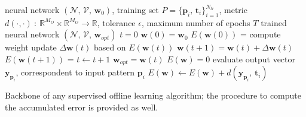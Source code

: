 \documentclass[12pt, a4paper, twoside, openright]{report}
\numberwithin{equation}{chapter}
\theoremstyle{theorem}
\theoremstyle{definition}
\theoremstyle{remark}
\theoremstyle{proposition}
\numberwithin{figure}{chapter}
\begin{document}
		\begin{algorithm}[t]
			\begin{algorithmic}[1]
				\Require neural network $\left( \mathcal{N}, \, \mathcal{V}, \, \mathbf{w}_0 \right)$, training set $P = \big\lbrace \mathbf{p}_i, \, \mathbf{t}_i \big\rbrace_{i = 1}^{N_{tr}}$, 
				\Statex \hspace*{0.535cm} metric $d(\cdot,\cdot) ~ : ~ \mathbb{R}^{M_O} \times \mathbb{R}^{M_O} \rightarrow \mathbb{R}$, tolerance $\epsilon$, maximum number of epochs $T$
				\Ensure trained neural network $\left( \mathcal{N}, \, \mathcal{V}, \, \mathbf{w}_{opt} \right)$
				\vspace*{0.2cm}
				\State $t = 0$
				\State $\mathbf{w}(0) = \mathbf{w}_0$
				\State $E(\mathbf{w}(0))$ = 
					\State compute weight update $\Delta \mathbf{w}(t)$ based on $E(\mathbf{w}(t))$
					\State $\mathbf{w}(t+1) = \mathbf{w}(t) + \Delta \mathbf{w}(t)$
					\State $E(\mathbf{w}(t+1))$ = 
					\State $t \leftarrow t+1$					
				\EndWhile		
				\State $\mathbf{w}_{opt} = \mathbf{w}(t)$
				\vspace*{0.2cm}
					\State $E(\mathbf{w}) = 0$
						\State evaluate output vector $\mathbf{y}_{\mathbf{p}_i}$, correspondent to input pattern $\mathbf{p}_i$
						\State $E(\mathbf{w}) \leftarrow E(\mathbf{w}) + d(\mathbf{y}_{\mathbf{p}_i}, \, \mathbf{t}_i)$
					\EndFor
				\EndFunction
			\end{algorithmic}
			
			\caption{Backbone of any supervised offline learning algorithm; the procedure to compute the accumulated error is provided as well.}
			\label{alg:offline-learning}
		\end{algorithm}
		
\end{document}
